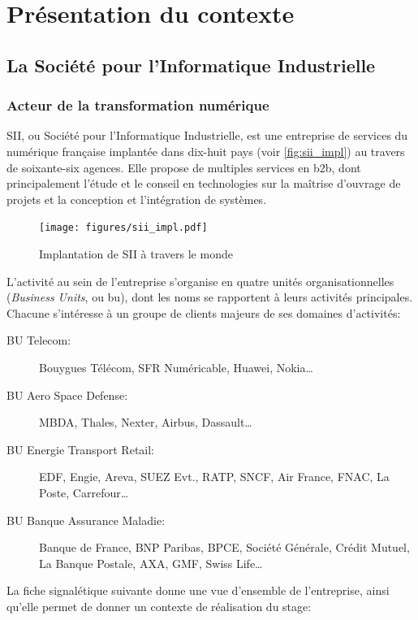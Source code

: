 \chapter{Présentation du contexte}
{
	\section{La Société pour l'Informatique Industrielle}
	{
		\subsection{Acteur de la transformation numérique}
		{
			\par
			{
				SII, ou Société pour l'Informatique Industrielle, est une entreprise de services du numérique française implantée dans dix-huit pays (voir \autoref{fig:sii_impl}) au travers de soixante-six agences. Elle propose de multiples services en \gls{b2b}, dont principalement l'étude et le conseil en technologies sur la maîtrise d'ouvrage de projets et la conception et l'intégration de systèmes.
			}
			
			\begin{figure}[h]
			{
				\centering
				\texttt{[image: figures/sii\_impl.pdf]}
				\caption{Implantation de SII à travers le monde\cite{sii_rf}}
				\label{fig:sii_impl}
			}
			\end{figure}
			
			\par
			{
				L'activité au sein de l'entreprise s'organise en quatre unités organisationnelles (\emph{Business Units}, ou \gls{bu}), dont les noms se rapportent à leurs activités principales. Chacune s'intéresse à un groupe de clients majeurs de ses domaines d'activités:
				\begin{description}
					\item[BU Telecom:] Bouygues Télécom, SFR Numéricable, Huawei, Nokia\dots
					\item[BU Aero Space Defense:] MBDA, Thales, Nexter, Airbus, Dassault\dots
					\item[BU Energie Transport Retail:] EDF, Engie, Areva, SUEZ Evt., RATP, SNCF, Air France, FNAC, La Poste, Carrefour\dots
					\item[BU Banque Assurance Maladie:] Banque de France, BNP Paribas, BPCE, Société Générale, Crédit Mutuel, La Banque Postale, AXA, GMF, Swiss Life\dots
				\end{description}
			}
			
			\par
			{
				La fiche signalétique suivante donne une vue d'ensemble de l'entreprise, ainsi qu'elle permet de donner un contexte de réalisation du stage:
			
}}}}
